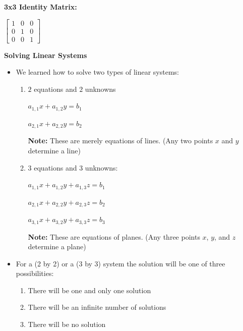 \documentclass[12pt]{article}
\newenvironment{myindentpar}[1]%
     {\begin{list}{}%
             {\setlength{\leftmargin}{#1}}%
             \item[]%
     }
     {\end{list}}
\begin{document}
\vspace{.5cm}

\begin{myindentpar}{1cm}
\centerline{
\textbf{3x3 Identity Matrix:}}
\vspace{.5cm}
\centerline{
$\begin{bmatrix}                                        
       1 & 0& 0           \\[.5em]			
       0& 1 & 0 \\[.5em]       		
       0 & 0 & 1   		
     \end{bmatrix}$}
\end{myindentpar}

\textbf{Solving Linear Systems}
\begin{itemize}
\item We learned how to solve two types of linear systems: 

\begin{enumerate}

\item $2$ equations and $2$ unknowns
\newline

\centerline{$a_{1,1}x + a_{1,2}y = b_{1}$}

\vspace{.3cm}

\centerline{$a_{2,1}x + a_{2,2}y = b_{2}$}

\textbf{Note:} These are merely equations of lines. (Any two points $x$ and $y$ determine a line)
\item $3$ equations and $3$ unknowns:
\newline

\centerline{$a_{1,1}x + a_{1,2}y + a_{1,3}z  = b_{1}$}

\vspace{.3cm}

\centerline{$a_{2,1}x + a_{2,2}y + a_{2,3}z  = b_{2}$}

\vspace{.3cm}

\centerline{$a_{3,1}x + a_{3,2}y + a_{3,3}z = b_{3}$}

\textbf{Note:} These are equations of planes. (Any three points $x$, $y$, and $z$ determine a plane)
\end{enumerate}

\item For a (2 by 2) or a (3 by 3) system the solution will be one of three possibilities:
\begin{enumerate}
\item There will be one and only one solution
\item There will be an infinite number of solutions
\item There will be no solution
\end{enumerate}


\end{itemize}
\end{document}
